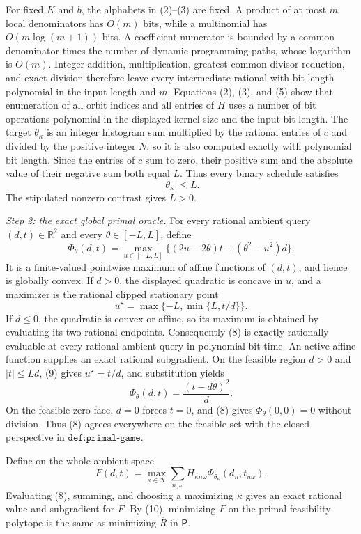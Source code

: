 For fixed \(K\) and \(b\), the alphabets in (2)--(3) are fixed.  A product of at most \(m\) local denominators has \(O(m)\) bits, while a multinomial has \(O(m\log(m+1))\) bits.  A coefficient numerator is bounded by a common denominator times the number of dynamic-programming paths, whose logarithm is \(O(m)\).  Integer addition, multiplication, greatest-common-divisor reduction, and exact division therefore leave every intermediate rational with bit length polynomial in the input length and \(m\).  Equations (2), (3), and (5) show that enumeration of all orbit indices and all entries of \(H\) uses a number of bit operations polynomial in the displayed kernel size and the input bit length.  The target \(\theta_\kappa\) is an integer histogram sum multiplied by the rational entries of \(c\) and divided by the positive integer \(N\), so it is also computed exactly with polynomial bit length.  Since the entries of \(c\) sum to zero, their positive sum and the absolute value of their negative sum both equal \(L\).  Thus every binary schedule satisfies
\[
 |\theta_\kappa|\le L.
\tag{7}
\]
The stipulated nonzero contrast gives \(L>0\).

\emph{Step 2: the exact global primal oracle.}
For every rational ambient query \((d,t)\in\mathbb R^2\) and every \(\theta\in[-L,L]\), define
\[
 \Phi_\theta(d,t)
 =\max_{u\in[-L,L]}
 \bigl\{(2u-2\theta)t+(\theta^2-u^2)d\bigr\}.
\tag{8}
\]
It is a finite-valued pointwise maximum of affine functions of \((d,t)\), and hence is globally convex.  If \(d>0\), the displayed quadratic is concave in \(u\), and a maximizer is the rational clipped stationary point
\[
 u^\star=\max\{-L,\min\{L,t/d\}\}.
\tag{9}
\]
If \(d\le0\), the quadratic is convex or affine, so its maximum is obtained by evaluating its two rational endpoints.  Consequently (8) is exactly rationally evaluable at every rational ambient query in polynomial bit time.  An active affine function supplies an exact rational subgradient.  On the feasible region \(d>0\) and \(|t|\le Ld\), (9) gives \(u^\star=t/d\), and substitution yields
\[
 \Phi_\theta(d,t)=\frac{(t-d\theta)^2}{d}.
\tag{10}
\]
On the feasible zero face, \(d=0\) forces \(t=0\), and (8) gives \(\Phi_\theta(0,0)=0\) without division.  Thus (8) agrees everywhere on the feasible set with the closed perspective in \(\texttt{def:primal-game}\).

Define on the whole ambient space
\[
 F(d,t)=\max_{\kappa\in\mathcal K}
 \sum_{n,\omega}H_{\kappa n\omega}
       \Phi_{\theta_\kappa}(d_n,t_{n\omega}).
\tag{11}
\]
Evaluating (8), summing, and choosing a maximizing \(\kappa\) gives an exact rational value and subgradient for \(F\).  By (10), minimizing \(F\) on the primal feasibility polytope is the same as minimizing \(\overline R\) in \(\mathsf P\).

